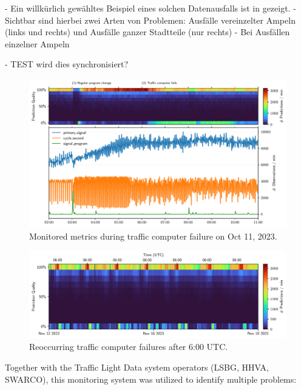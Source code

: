 - Ein willkürlich gewähltes Beispiel eines solchen Datenausfalls ist in  gezeigt.
- Sichtbar sind hierbei zwei Arten von Problemen: Ausfälle vereinzelter Ampeln (links und rechts) und Ausfälle ganzer Stadtteile (nur rechts)
- Bei Ausfällen einzelner Ampeln 

- TEST wird dies synchronisiert?

\begin{figure}[htbp]
    \centering
    \includegraphics[width=\linewidth]{images/monitoring-failure.pdf}
    \caption{Monitored metrics during traffic computer failure on Oct 11, 2023.}\label{fig:monitoring-failure}
\end{figure}

\begin{figure}[htbp]
    \centering
    \includegraphics[width=\linewidth]{images/monitoring-7-days.pdf}
    \caption{Reoccurring traffic computer failures after 6:00 UTC.}\label{fig:monitoring-7-days}
\end{figure}

Together with the Traffic Light Data system operators (LSBG, HHVA, SWARCO), this monitoring system was utilized to identify multiple problems:

